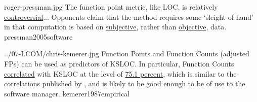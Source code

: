 \documentclass{article}
\begin{document}

\qte
  {roger-pressman.jpg}
  {The function point metric, like LOC, is relatively \ul{controversial}... Opponents claim that the method requires some `sleight of hand' in that computation is based on \ul{subjective}, rather than \ul{objective}, data.}
  {pressman2005software}

\qte
  {../07-LCOM/chris-kemerer.jpg}
  {Function Points and Function Counts (adjusted FPs) can be used as predictors of KSLOC. In particular, Function Counts \ul{correlated} with KSLOC at the level of \ul{75.1 percent}, which is similar to the correlations published by \citet{albrecht1983software}, and is likely to be good enough to be of use to the software manager.}
  {kemerer1987empirical}
\end{document}
